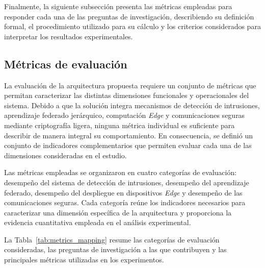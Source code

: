 \documentclass[journal,article,submit,moreauthors]{Definitions/mdpi}
\begin{document}
Finalmente, la siguiente subsección presenta las métricas empleadas para responder cada una de las preguntas de investigación, describiendo su definición formal, el procedimiento utilizado para su cálculo y los criterios considerados para interpretar los resultados experimentales.

\subsection{Métricas de evaluación}
La evaluación de la arquitectura propuesta requiere un conjunto de métricas que permitan caracterizar las distintas dimensiones funcionales y operacionales del sistema. Debido a que la solución integra mecanismos de detección de intrusiones, aprendizaje federado jerárquico, computación \textit{Edge} y comunicaciones seguras mediante criptografía ligera, ninguna métrica individual es suficiente para describir de manera integral su comportamiento. En consecuencia, se definió un conjunto de indicadores complementarios que permiten evaluar cada una de las dimensiones consideradas en el estudio.

Las métricas empleadas se organizaron en cuatro categorías de evaluación: desempeño del sistema de detección de intrusiones, desempeño del aprendizaje federado, desempeño del despliegue en dispositivos \textit{Edge} y desempeño de las comunicaciones seguras. Cada categoría reúne los indicadores necesarios para caracterizar una dimensión específica de la arquitectura y proporciona la evidencia cuantitativa empleada en el análisis experimental.

La Tabla~\ref{tab:metrics_mapping} resume las categorías de evaluación consideradas, las preguntas de investigación a las que contribuyen y las principales métricas utilizadas en los experimentos.
\end{document}

